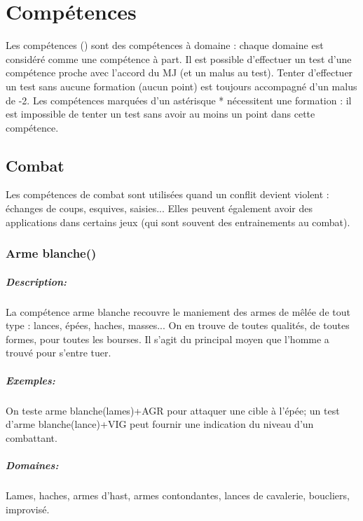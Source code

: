 \documentclass[10pt,a4paper,twocolumn]{book}
\begin{document}
\chapter{Compétences}
Les compétences () sont des compétences à domaine : chaque domaine est considéré comme une compétence à part.
Il est possible d’effectuer un test d’une compétence proche avec l’accord du MJ (et un malus au test).
Tenter d’effectuer un test sans aucune formation (aucun point) est toujours accompagné d’un malus de -2.
Les compétences marquées d’un astérisque * nécessitent une formation : il est impossible de tenter un test sans avoir au moins un point dans cette compétence.

\section{Combat}
Les compétences de combat sont utilisées quand un conflit devient violent : échanges de coups, esquives, saisies... Elles peuvent également avoir des applications dans certains jeux (qui sont souvent des entrainements au combat).
\subsection{Arme blanche()}
\paragraph{Description:}La compétence arme blanche recouvre le maniement des armes de mêlée de tout type : lances, épées, haches, masses... On en trouve de toutes qualités, de toutes formes, pour toutes les bourses. Il s'agit du principal moyen que l'homme a trouvé pour s’entre tuer.
\paragraph{Exemples:}On teste arme blanche(lames)+AGR pour attaquer une cible à l'épée; un test d'arme blanche(lance)+VIG peut fournir une indication du niveau d'un combattant.
\paragraph{Domaines:}Lames, haches, armes d'hast, armes contondantes, lances de cavalerie, boucliers, improvisé.
\end{document}
